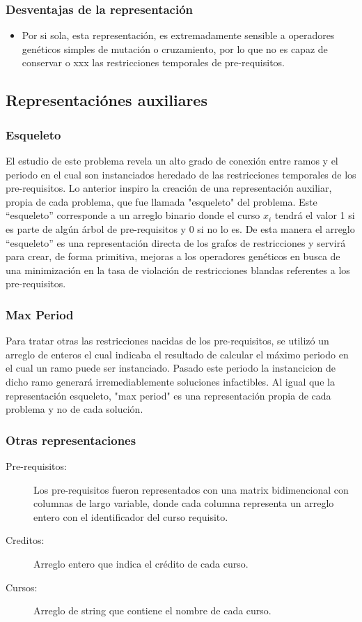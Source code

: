 \documentclass[letter, 10pt]{article}
\begin{document}
\subsubsection{Desventajas de la representación}
\begin{itemize}
	\item Por si sola, esta representación, es extremadamente sensible a
          operadores genéticos simples de mutación o cruzamiento, por lo que no
          es capaz de conservar o xxx las restricciones temporales de
          pre-requisitos.
\end{itemize}

\subsection{Representaciónes auxiliares}
\subsubsection{Esqueleto}
El estudio de este problema revela un alto grado de conexión entre ramos y el
periodo en el cual son instanciados heredado de las restricciones temporales de
los pre-requisitos. Lo anterior inspiro la creación de una representación
auxiliar, propia de cada problema, que fue llamada "esqueleto" del problema.
Este ``esqueleto'' corresponde a un arreglo binario donde el curso $x_{i}$ tendrá
el valor 1 si es parte de algún árbol de pre-requisitos y 0 si no lo es. De esta
manera el arreglo ``esqueleto'' es una representación directa de los grafos de
restricciones y servirá para crear, de forma primitiva, mejoras a los operadores
genéticos en busca de una minimización en la tasa de violación de restricciones
blandas referentes a los pre-requisitos.

\subsubsection{Max Period}
Para tratar otras las restricciones nacidas de los pre-requisitos, se utilizó un
arreglo de enteros el cual indicaba el resultado de calcular el máximo periodo
en el cual un ramo puede ser instanciado. Pasado este periodo la instancicion de
dicho ramo generará irremediablemente soluciones infactibles. Al igual que la
representación esqueleto, "max period" es una representación propia de cada
problema y no de cada solución.

\subsubsection{Otras representaciones}
\begin{description}
\item[Pre-requisitos:] Los pre-requisitos fueron representados con una matrix
  bidimencional con columnas de largo variable, donde cada columna representa un
  arreglo entero con el identificador del curso requisito.
\item[Creditos:] Arreglo entero que indica el crédito de cada curso.
\item[Cursos:] Arreglo de string que contiene el nombre de cada curso.

\end{description}
\end{document}
